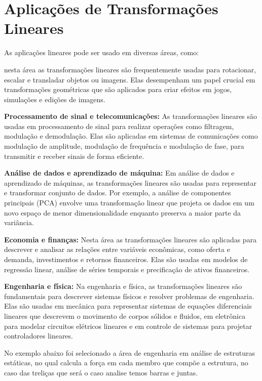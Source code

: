 \chapter{Aplicações de Transformações Lineares}
	As aplicações lineares pode ser usado em diversas áreas, como:

 nesta área as transformações lineares são frequentemente usadas para rotacionar, escalar e transladar objetos ou imagens. Elas desempenham um papel crucial em transformações geométricas que são aplicados para criar efeitos em jogos, simulações e edições de imagens. 

\textbf{Processamento de sinal e telecomunicações:} As transformações lineares são usadas em processamento de sinal para realizar operações como filtragem, modulação e demodulação. Elas são aplicadas em sistemas de comunicações como modulação de amplitude, modulação de frequência e modulação de fase, para transmitir e receber sinais de forma eficiente.  

\textbf{Análise de dados e aprendizado de máquina:} Em análise de dados e aprendizado de máquinas, as transformações lineares são usadas para representar e transformar conjunto de dados. Por exemplo, a análise de componentes principais (PCA) envolve uma transformação linear que projeta os dados em um novo espaço de menor dimensionalidade enquanto preserva a maior parte da variância.

\textbf{Economia e finanças:} Nesta área as transformações lineares são aplicadas para descrever e analisar as relações entre variáveis econômicas, como oferta e demanda, investimentos e retornos financeiros. Elas são usadas em modelos de regressão linear, análise de séries temporais e precificação de ativos financeiros. 

\textbf{Engenharia e física:} Na engenharia e física, as transformações lineares são fundamentais para descrever sistemas físicos e resolver problemas de engenharia. Elas são usadas em mecânica para representar sistemas de equações diferenciais lineares que descrevem o movimento de corpos sólidos e fluidos, em eletrônica para modelar circuitos elétricos lineares e em controle de sistemas para projetar controladores lineares.

No exemplo abaixo foi selecionado a área de engenharia em análise de estruturas estáticas, no qual calcula a força em cada membro que compõe a estrutura, no caso das treliças que será o caso analise temos barras e juntas.
 
